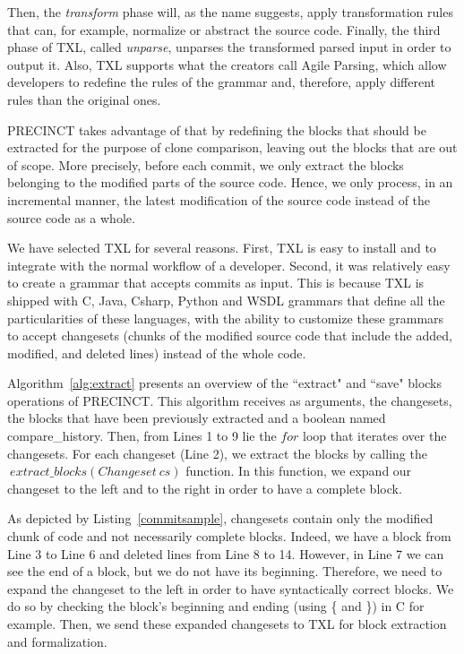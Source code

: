 Then, the \textit{transform} phase will, as the name suggests, apply transformation rules that can, for example, normalize or abstract the source code. Finally, the third phase of TXL,  called \textit{unparse}, unparses the transformed parsed input in order to output it.
Also, TXL supports what the creators call Agile Parsing\cite{Dean}, which allow developers to redefine the rules of the grammar and, therefore, apply different rules than the original ones.


PRECINCT takes advantage of that by redefining the blocks that should be extracted for the purpose of clone comparison, leaving out the  blocks that are out of scope.
More precisely, before each commit, we only extract the blocks belonging to the modified parts of the source code.
Hence, we only process, in an incremental manner, the latest modification of the source code instead of the source code as a whole.

We have selected TXL for several reasons. First, TXL is easy to install and to integrate with the normal workflow of a developer.
Second, it was relatively easy to create a grammar that accepts commits as input.
This is because TXL is shipped with C, Java, Csharp, Python and WSDL grammars that define all the particularities of these languages, with the ability to customize these grammars to accept changesets (chunks of the modified source code that include the added, modified, and deleted lines) instead of the whole code.



Algorithm~\ref{alg:extract} presents an overview of the ``extract" and ``save" blocks operations of PRECINCT. This algorithm receives as arguments, the changesets, the blocks that have been previously extracted and a boolean named compare\_history.
Then, from Lines 1 to 9 lie the $for$ loop that iterates over the changesets. For each changeset (Line 2), we extract the blocks by calling the $~extract\_blocks(Changeset~cs)$ function.
In this function, we expand our changeset to the left and to the right in order to have a complete block.

As depicted by Listing~\ref{commitsample}, changesets contain only the modified chunk of code and not necessarily complete blocks. Indeed, we have a block from Line 3 to Line 6 and deleted lines from Line 8 to 14.
However, in Line 7 we can see the end of a block, but we do not have its beginning. Therefore, we need to expand the changeset to the left in order to have syntactically correct blocks.
We do so by checking the block's beginning and ending (using \{ and \}) in C for example.
Then, we send these expanded changesets to TXL for block extraction and formalization.

